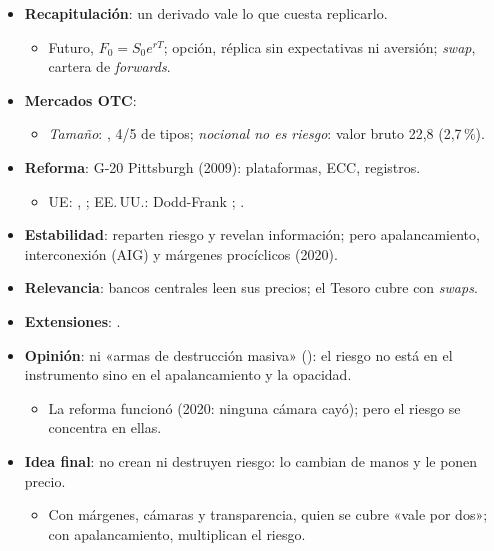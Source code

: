 \documentclass{article}
\begin{document}
\begin{columnas}
\begin{itemize}
\item \textbf{Recapitulación}: un derivado vale lo que cuesta replicarlo.
  \begin{itemize}
  \item Futuro, $F_0=S_0e^{rT}$; opción, réplica sin expectativas ni aversión; \emph{swap}, cartera de \emph{forwards}.
  \end{itemize}
\item \textbf{Mercados OTC}:
  \begin{itemize}
  \item \emph{Tamaño}: , 4/5 de tipos; \emph{nocional no es riesgo}: valor bruto 22,8 (2,7\,\%).
  \end{itemize}
\end{itemize}
\begin{itemize}
\item \textbf{Reforma}: G-20 Pittsburgh (2009): plataformas, ECC, registros.
  \begin{itemize}
  \item UE: , ; EE.\,UU.: Dodd-Frank ; .
  \end{itemize}
\item \textbf{Estabilidad}: reparten riesgo y revelan información; pero apalancamiento, interconexión (AIG) y márgenes procíclicos (2020).
\item \textbf{Relevancia}: bancos centrales leen sus precios; el Tesoro cubre con \emph{swaps}.
\item \textbf{Extensiones}:       .
\item \textbf{Opinión}: ni «armas de destrucción masiva» (): el riesgo no está en el instrumento sino en el apalancamiento y la opacidad.
  \begin{itemize}
  \item La reforma funcionó (2020: ninguna cámara cayó); pero el riesgo se concentra en ellas.
  \end{itemize}
\item \textbf{Idea final}: no crean ni destruyen riesgo: lo cambian de manos y le ponen precio.
  \begin{itemize}
  \item Con márgenes, cámaras y transparencia, quien se cubre «vale por dos»; con apalancamiento, multiplican el riesgo.
  \end{itemize}
\end{itemize}


\end{columnas}
\end{document}

